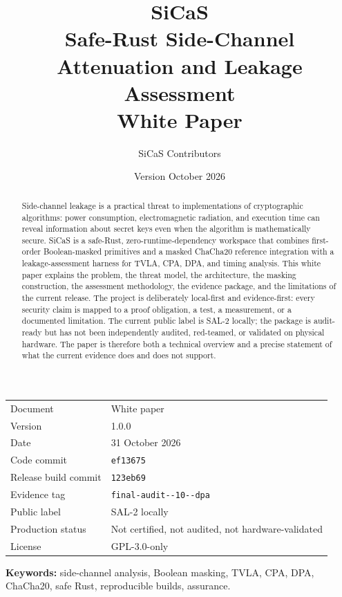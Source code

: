 \documentclass[11pt,a4paper]{article}
\title{%
  \vspace{-1.2cm}
  {\LARGE\bfseries SiCaS}\\[0.35cm]
  {\Large Safe-Rust Side-Channel Attenuation and Leakage Assessment}\\[0.25cm]
  {\large White Paper}
}
\author{SiCaS Contributors}
\date{Version \paperversion \quad 31 October 2026}
\newcommand{\paperversion}{1.0.0}
\newcommand{\codecommit}{\texttt{ef13675}}
\newcommand{\evidencetag}{\texttt{final-\allowbreak audit-\allowbreak 2026-10-\allowbreak 31-\allowbreak dpa}}
\theoremstyle{plain}
\theoremstyle{definition}
\theoremstyle{remark}
\begin{document}
\maketitle
\thispagestyle{empty}

\begin{center}
\begin{tabular}{@{}ll@{}}
\toprule
Document & White paper \\
Version & \paperversion \\
Date & 31 October 2026 \\
Code commit & \codecommit \\
Release build commit & \texttt{123eb69} \\
Evidence tag & \evidencetag \\
Public label & SAL-2 locally \\
Production status & Not certified, not audited, not hardware-validated \\
License & GPL-3.0-only \\
\bottomrule
\end{tabular}
\end{center}

\begin{abstract}
Side-channel leakage is a practical threat to implementations of cryptographic
algorithms: power consumption, electromagnetic radiation, and execution time can reveal
information about secret keys even when the algorithm is mathematically secure. SiCaS is
a safe-Rust, zero-runtime-dependency workspace that combines first-order Boolean-masked
primitives and a masked ChaCha20 reference integration with a leakage-assessment
harness for TVLA, CPA, DPA, and timing analysis. This white paper explains the problem,
the threat model, the architecture, the masking construction, the assessment
methodology, the evidence package, and the limitations of the current release. The
project is deliberately local-first and evidence-first: every security claim is mapped
to a proof obligation, a test, a measurement, or a documented limitation. The current
public label is SAL-2 locally; the package is audit-ready but has not been independently
audited, red-teamed, or validated on physical hardware. The paper is therefore both a
technical overview and a precise statement of what the current evidence does and does
not support.
\end{abstract}

\vspace{0.3cm}
\noindent\textbf{Keywords:} side-channel analysis, Boolean masking, TVLA, CPA, DPA,
ChaCha20, safe Rust, reproducible builds, assurance.
\end{document}
